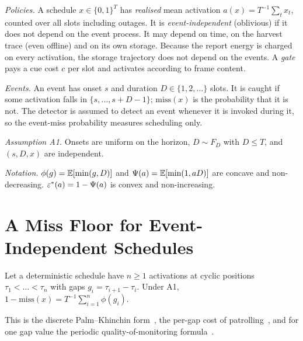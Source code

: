 \emph{Policies.} A schedule $x\in\{0,1\}^T$ has \emph{realised} mean activation $a(x)=T^{-1}\sum_tx_t$, counted over all slots including outages. It is \emph{event-independent} (oblivious) if it does not depend on the event process. It may depend on time, on the harvest trace (even offline) and on its own storage. Because the report energy is charged on every activation, the storage trajectory does not depend on the events. A \emph{gate} pays a cue cost $c$ per slot and activates according to frame content.

\emph{Events.} An event has onset $s$ and duration $D\in\{1,2,\dots\}$ slots. It is caught if some activation falls in $\{s,\dots,s+D-1\}$; $\mathrm{miss}(x)$ is the probability that it is not. The detector is assumed to detect an event whenever it is invoked during it, so the event-miss probability measures scheduling only.

\emph{Assumption A1.} Onsets are uniform on the horizon, $D\sim F_D$ with $D\le T$, and $(s,D,x)$ are independent.

\emph{Notation.} $\phi(g)=\mathbb{E}[\min(g,D)]$ and $\Psi(a)=\mathbb{E}[\min(1,aD)]$ are concave and non-decreasing. $\varepsilon^*(a)=1-\Psi(a)$ is convex and non-increasing.

\section{A Miss Floor for Event-Independent Schedules}\label{sec:floor}
\begin{lemma}\label{lem:gap}
Let a deterministic schedule have $n\ge1$ activations at cyclic positions $\tau_1<\dots<\tau_n$ with gaps $g_i=\tau_{i+1}-\tau_i$. Under A1, $1-\mathrm{miss}(x)=T^{-1}\sum_{i=1}^n\phi(g_i)$.
\end{lemma}
\noindent This is the discrete Palm--Khinchin form~\cite{daley2003pp1}, the per-gap cost of patrolling~\cite{lin2013opre}, and for one gap value the periodic quality-of-monitoring formula~\cite[Thm.~4.2]{yau2010tosn}.

